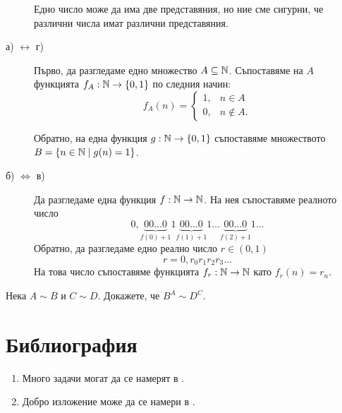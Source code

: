 \begin{hint}
\begin{description}
    Едно число може да има две представяния, но ние сме сигурни, че различни числа имат различни представяния.
  \item[а) $\leftrightarrow$ г)]
    Първо, да разгледаме едно множество $A \subseteq \mathbb{N}$.
    Съпоставяме на $A$ функцията $f_A:\mathbb{N} \to \{0,1\}$  по следния начин:
    \[
    f_A(n) = 
    \begin{cases}
      1, & n \in A\\
      0, & n\not\in A.
    \end{cases}
    \]

    Обратно, на една функция $g:\mathbb{N}\to\{0,1\}$ съпоставяме множеството $B = \{n \in \mathbb{N} \mid g(n) = 1\}$.


  \item[б) $\iff$ в)]
    Да разгледаме една функция $f:\mathbb{N}\to\mathbb{N}$.
    На нея съпоставяме реалното число
    \[0,\underbrace{00\dots 0}_{f(0)+1}1\underbrace{00\dots 0}_{f(1)+1}1\dots\underbrace{00\dots 0}_{f(2)+1}1\dots\]
    Обратно, да разгледаме едно реално число $r\in (0,1)$
    \[r = 0, r_0r_1r_2r_3\dots\]
    На това число съпоставяме функцията $f_r:\mathbb{N}\to\mathbb{N}$ като $f_r(n) = r_n$.
  \end{description}
\end{hint}

\begin{problem}
  Нека $A \sim B$ и $C \sim D$. Докажете, че $B^A \sim D^C$.
\end{problem}

\section*{Библиография}
\begin{enumerate}[]
\item 
  Много задачи могат да се намерят в \cite[§1.4]{lavrov-maksimova}.
\item
  Добро изложение може да се намери в \cite[Глава 7]{prove-it}.
\end{enumerate}

